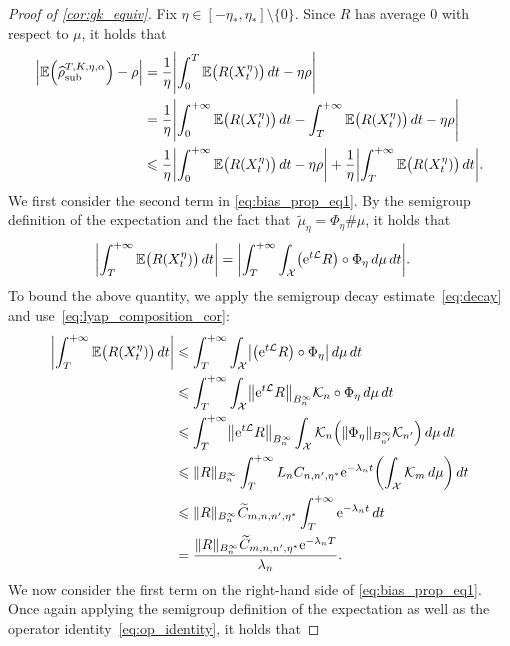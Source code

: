 \documentclass[11pt]{article}
\newcommand{\E}{\mathbb{E}}
\newcommand{\e}{\mathrm{e}}
\renewcommand{\L}{\mathcal{L}}
\renewcommand{\leq}{\leqslant}
\DeclarePairedDelimiter\abs{\lvert}{\rvert}
\DeclarePairedDelimiter\norm{\lVert}{\rVert}
\DeclarePairedDelimiter\paren{\lparen}{\rparen}
\theoremstyle{definition}
\newcommand{\psip}{\widetilde{\mu}_\eta}
\newcommand{\estTmp}{\widehat{\rho}}
\newcommand{\aTSest}{\estTmp^{T,K,\eta,\alpha}_{\rm sub}} %
\begin{document}
\begin{proof}[Proof of \cref{cor:gk_equiv}]
	Fix $\eta \in [-\eta_*, \eta_*] \setminus \{0\}$. Since $R$ has average 0 with respect to $\mu$, it holds that
\begin{align}
    \notag
\left|\E\paren*{\aTSest} - \rho\right| &= \frac{1}{\eta}\Biggl|\int_0^T \E\bigl(R(X^\eta_t)\bigr) \, dt - \eta\rho\Biggr| \\
    \notag
&= \frac{1}{\eta}\Biggl|\int_0^{+\infty} \E\bigl(R(X^\eta_t)\bigr) \, dt - \int_T^{+\infty} \E\bigl(R(X^\eta_t)\bigr) \, dt - \eta\rho\Biggr| \\
&\leq \frac{1}{\eta}\abs*{\int_0^{+\infty} \E\bigl(R(X^\eta_t)\bigr) \, dt - \eta\rho} + \frac{1}{\eta}\abs*{\int_T^{+\infty} \E\bigl(R(X^\eta_t)\bigr) \, dt}.
\label{eq:bias_prop_eq1}
\end{align}
We first consider the second term in \eqref{eq:bias_prop_eq1}. By the semigroup definition of the expectation and the fact that~$\psip = \Phi_\eta\#\mu$, it holds that
\begin{align}
    \notag
		\abs*{\int_T^{+\infty} \E\bigl(R(X^\eta_t)\bigr) \, dt} &= \abs*{\int_T^{+\infty} \int_\mathcal{X} \bigl(\e^{t\L} R\bigr) \circ \Phi_\eta \, d\mu \, dt}.
\end{align}
To bound the above quantity, we apply the semigroup decay estimate~\eqref{eq:decay} and use~\eqref{eq:lyap_composition_cor}: 
\begin{align*}
		\abs*{\int_T^{+\infty} \E\bigl(R(X^\eta_t)\bigr) \, dt} &\leq \int_T^{+\infty} \int_\mathcal{X} \abs*{\bigl(\e^{t\L} R\bigr) \circ \Phi_\eta} \, d\mu \, dt \\
		&\leq \int_T^{+\infty} \int_\mathcal{X} \norm*{\e^{t\L} R}_{B^\infty_n} \mathcal{K}_n \circ \Phi_\eta \, d\mu \, dt \\
		&\leq \int_T^{+\infty} \norm*{\e^{t\L} R}_{B^\infty_n} \int_\mathcal{X} \mathcal{K}_n\paren*{\norm{\Phi_\eta}_{B^\infty_{n'}} \mathcal{K}_{n'}} \, d\mu \, dt \\
		&\leq \norm{R}_{B^\infty_n}\int_T^{+\infty} L_n C_{n,n',\eta^*} \e^{-\lambda_n t} \paren*{\int_\mathcal{X} \mathcal{K}_m \, d\mu} \, dt \\
		&\leq \norm{R}_{B^\infty_n}\widetilde{C}_{m,n,n',\eta^*}\int_T^{+\infty} \e^{-\lambda_n t} \, dt \\
  &= \frac{\norm{R}_{B^\infty_n}\widetilde{C}_{m,n,n',\eta^*}\e^{-\lambda_n T}}{\lambda_n}. 
\end{align*}
We now consider the first term on the right-hand side of \eqref{eq:bias_prop_eq1}. 
Once again applying the semigroup definition of the expectation as well as the operator identity~\eqref{eq:op_identity}, it holds that

\end{proof}
\end{document}
